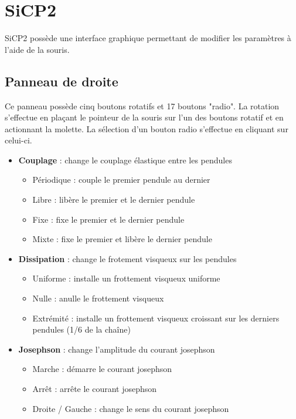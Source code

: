 %
\section{SiCP2}
%
%
SiCP2 possède une interface graphique permettant de modifier les paramètres à l'aide de la souris.
%
\subsection{Panneau de droite}
%
Ce panneau possède cinq boutons rotatifs et 17 boutons "radio". La rotation s'effectue en plaçant le pointeur de la souris sur l'un des boutons rotatif et en actionnant la molette. La sélection d'un bouton radio s'effectue en cliquant sur celui-ci. 
%
%
\begin{itemize}[leftmargin=1cm, label=, itemsep=0pt]
	\item {\bf Couplage} : change le couplage élastique entre les pendules
	\begin{itemize}[leftmargin=1cm, label=, itemsep=0pt]
		\item Périodique : couple le premier pendule au dernier
		\item Libre : libère le premier et le dernier pendule
		\item Fixe : fixe le premier et le dernier pendule
		\item Mixte : fixe le premier et libère le dernier pendule
	\end{itemize}
	\item {\bf Dissipation} : change le frotement visqueux sur les pendules
	\begin{itemize}[leftmargin=1cm, label=, itemsep=0pt]
		\item Uniforme : installe un frottement visqueux uniforme
		\item Nulle : anulle le frottement visqueux
		\item Extrémité : installe un frottement visqueux croissant sur les derniers pendules (1/6 de la chaîne)
	\end{itemize}
	\item {\bf Josephson} : change l'amplitude du courant josephson
	\begin{itemize}[leftmargin=1cm, label=, itemsep=0pt]
		\item Marche : démarre le courant josephson
		\item Arrêt : arrête le courant josephson
		\item Droite / Gauche : change le sens du courant josephson

\end{itemize}
\end{itemize}
